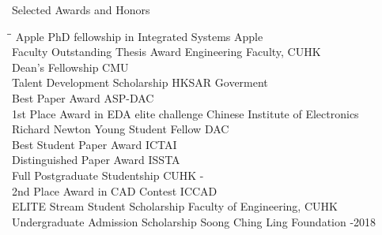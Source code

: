 
\begin{rSection}{Selected Awards and Honors}
\begin{tabbing}
\hspace{3.6in}\= \hspace{2.1in}\= \kill
Apple PhD fellowship in Integrated Systems \> Apple  \\
Faculty Outstanding Thesis Award \> Engineering Faculty, CUHK  \\
Dean's Fellowship \> CMU  \\
Talent Development Scholarship \> HKSAR Goverment  \\
Best Paper Award                       \> ASP-DAC                       \\
1st Place Award in EDA elite challenge\> Chinese Institute of Electronics  \\
Richard Newton Young Student Fellow    \> DAC  \\
Best Student Paper Award                       \> ICTAI                       \\
Distinguished Paper Award                      \>ISSTA                      \\
Full Postgraduate Studentship   \>CUHK  -\\
     2nd Place Award in CAD Contest               \> ICCAD                       \\
    ELITE Stream Student Scholarship                \> Faculty of Engineering, CUHK                             \\
    Undergraduate Admission Scholarship                             \> Soong Ching Ling Foundation  -2018 \\
\end{tabbing}
\end{rSection}


